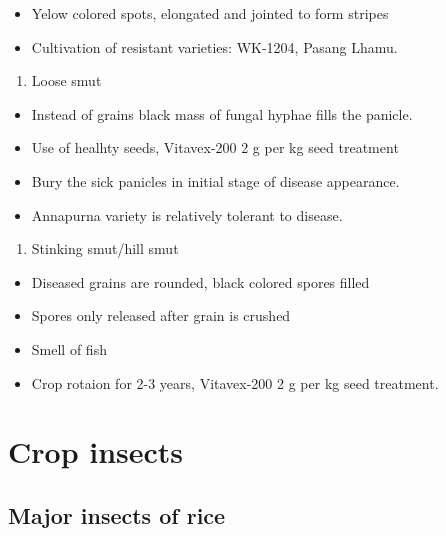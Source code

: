 \documentclass[]{book}
\providecommand{\tightlist}{%
  \setlength{\itemsep}{0pt}\setlength{\parskip}{0pt}}
\begin{document}
\begin{itemize}
\tightlist
\item
  Yelow colored spots, elongated and jointed to form stripes
\item
  Cultivation of resistant varieties: WK-1204, Pasang Lhamu.
\end{itemize}

\begin{enumerate}
\def\labelenumi{\arabic{enumi}.}
\setcounter{enumi}{3}
\tightlist
\item
  Loose smut
\end{enumerate}

\begin{itemize}
\tightlist
\item
  Instead of grains black mass of fungal hyphae fills the panicle.
\item
  Use of healhty seeds, Vitavex-200 2 g per kg seed treatment
\item
  Bury the sick panicles in initial stage of disease appearance.
\item
  Annapurna variety is relatively tolerant to disease.
\end{itemize}

\begin{enumerate}
\def\labelenumi{\arabic{enumi}.}
\setcounter{enumi}{4}
\tightlist
\item
  Stinking smut/hill smut
\end{enumerate}

\begin{itemize}
\tightlist
\item
  Diseased grains are rounded, black colored spores filled
\item
  Spores only released after grain is crushed
\item
  Smell of fish
\item
  Crop rotaion for 2-3 years, Vitavex-200 2 g per kg seed treatment.
\end{itemize}

\hypertarget{crop-insects}{%
\section{Crop insects}\label{crop-insects}}

\hypertarget{major-insects-of-rice}{%
\subsection{Major insects of rice}\label{major-insects-of-rice}}
\end{document}
